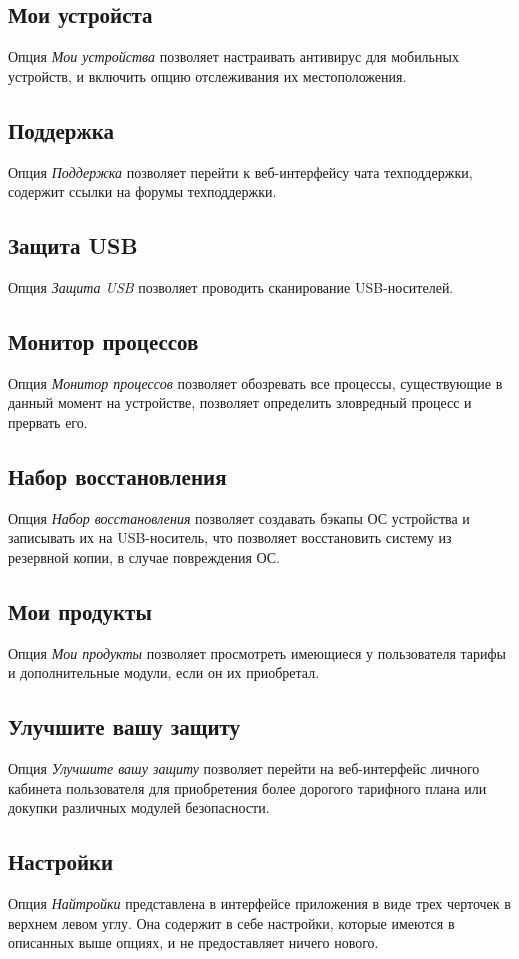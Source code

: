         \subsection{Мои устройста}
        Опция \emph{Мои устройства} позволяет настраивать антивирус для мобильных устройств, и включить опцию отслеживания
        их местоположения.
        \subsection{Поддержка}
        Опция \emph{Поддержка} позволяет перейти к веб-интерфейсу чата техподдержки, содержит ссылки на форумы техподдержки.
        \subsection{Защита USB}
        Опция \emph{Защита USB} позволяет проводить сканирование USB-носителей.
        \subsection{Монитор процессов}
        Опция \emph{Монитор процессов} позволяет обозревать все процессы, существующие в данный момент на устройстве, позволяет
        определить зловредный процесс и прервать его.
        \subsection{Набор восстановления}
        Опция \emph{Набор восстановления} позволяет создавать бэкапы ОС устройства и записывать их на USB-носитель, что позволяет
        восстановить систему из резервной копии, в случае повреждения ОС.
        \subsection{Мои продукты}
        Опция \emph{Мои продукты} позволяет просмотреть имеющиеся у пользователя тарифы и дополнительные модули, если он их приобретал.
        \subsection{Улучшите вашу защиту}
        Опция \emph{Улучшите вашу защиту} позволяет перейти на веб-интерфейс личного кабинета пользователя для приобретения более дорогого
        тарифного плана или докупки различных модулей безопасности.
        \subsection{Настройки}
        Опция \emph{Найтройки} представлена в интерфейсе приложения в виде трех черточек в верхнем левом углу. Она содержит в себе настройки,
        которые имеются в описанных выше опциях, и не предоставляет ничего нового.
    \pagebreak

